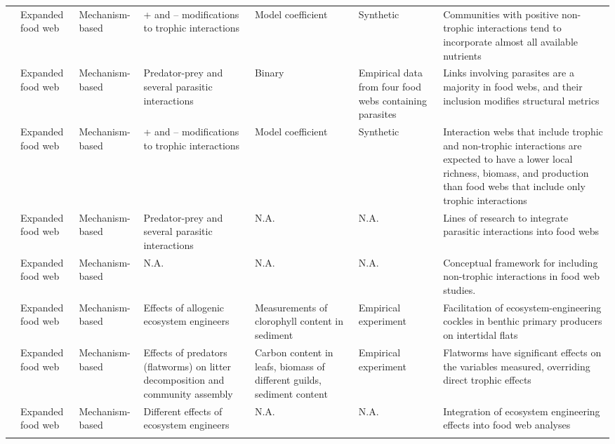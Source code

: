 {\begin{landscape}
\begin{footnotesize}
\begin{longtable}{p{1.5cm}p{1.5cm}p{2cm}p{2cm}p{2cm}p{2cm}p{4cm}}
\citealt{Arditi2005} & %
Expanded food web &
Mechanism-based &
+ and -- modifications to trophic interactions &
Model coefficient &
Synthetic &
Communities with positive non-trophic interactions tend to incorporate almost all available nutrients\\%
\citealt{Lafferty2006} &%
Expanded food web &
Mechanism-based &
Predator-prey and several parasitic interactions &
Binary &
Empirical data from four food webs containing parasites &
Links involving parasites are a majority in food webs, and their inclusion modifies structural metrics\\%
\citealt{Goudard2008} & %
Expanded food web &
Mechanism-based &
+ and -- modifications to trophic interactions &
Model coefficient &
Synthetic &
Interaction webs that include trophic and non-trophic interactions are expected to have a lower local richness, biomass, and production than food webs that include only trophic interactions\\%
\citealt{Lafferty2008} & %
Expanded food web &
Mechanism-based &
Predator-prey and several parasitic interactions &
N.A. &
N.A. &
Lines of research to integrate parasitic interactions into food webs\\%
\citealt{Kefi2012} & %
Expanded food web &
Mechanism-based &
N.A. &
N.A. &
N.A. &
Conceptual framework for including non-trophic interactions in food web studies.\\%
\citealt{Donadi2013} & %
Expanded food web &
Mechanism-based &
Effects of allogenic ecosystem engineers &
Measurements of clorophyll content in sediment &
Empirical experiment &
Facilitation of ecosystem-engineering cockles in benthic primary producers on intertidal flats\\%
\citealt{Majdi2014} & %
Expanded food web &
Mechanism-based &
Effects of predators (flatworms) on litter decomposition and community assembly &
Carbon content in leafs, biomass of different guilds, sediment content  &
Empirical experiment &
Flatworms have significant effects on the variables measured, overriding direct trophic effects\\%
\citealt{Sanders2014} & %
Expanded food web &
Mechanism-based &
Different effects of ecosystem engineers &
N.A. &
N.A. &
Integration of ecosystem engineering effects into food web analyses\\%
\citealt{Bachelot2015} & %

\end{longtable}
\end{footnotesize}
\end{landscape}}
